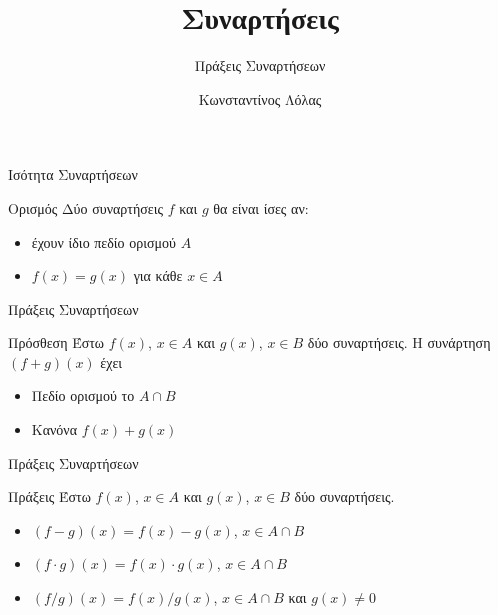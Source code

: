 \documentclass{presentation}
\title{Συναρτήσεις}
\subtitle{Πράξεις Συναρτήσεων}
\author[Λόλας]{Κωνσταντίνος Λόλας }
\institute[$10^ο$ ΓΕΛ]{$10^ο$ ΓΕΛ Θεσσαλονίκης}
\date{}
\begin{document}
\begin{frame}
      \titlepage
\end{frame}
\begin{frame}{Ισότητα Συναρτήσεων}
      \begin{block}{Ορισμός}
            Δύο συναρτήσεις $f$ και $g$ θα είναι ίσες αν:
            \begin{itemize}
                  \item έχουν ίδιο πεδίο ορισμού $Α$
                  \item $f(x)=g(x)$ για κάθε $x\in Α$
            \end{itemize}
      \end{block}
\end{frame}

\begin{frame}{Πράξεις Συναρτήσεων}
      \begin{block}{Πρόσθεση}
            Έστω $f(x)$, $x\in Α$ και $g(x)$, $x\in Β$ δύο συναρτήσεις. Η συνάρτηση $(f+g)(x)$ έχει
            \begin{itemize}
                  \item Πεδίο ορισμού το $A\cap Β$
                  \item Κανόνα $f(x)+g(x)$
            \end{itemize}
      \end{block}
\end{frame}

\begin{frame}{Πράξεις Συναρτήσεων}
      \begin{block}{Πράξεις}
            Έστω $f(x)$, $x\in Α$ και $g(x)$, $x\in Β$ δύο συναρτήσεις.
            \begin{itemize}
                  \item $(f-g)(x)=f(x)-g(x)$, $x\in A\cap Β$
                  \item $(f\cdot g)(x)=f(x)\cdot g(x)$, $x\in A\cap Β$
                  \item $(f/g)(x)=f(x)/g(x)$, $x\in A\cap Β$ και $g(x)\ne 0$
            \end{itemize}
      \end{block}
\end{frame}
\end{document}

